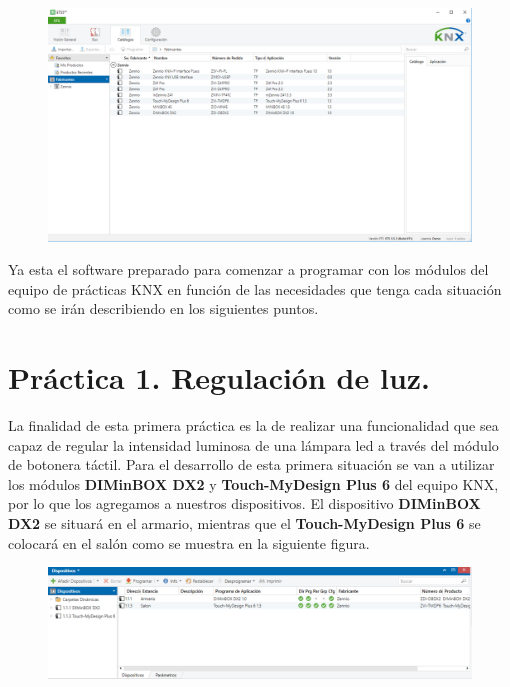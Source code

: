 \documentclass[10pt]{article}
\begin{document}
\begin{figure}[H]
	\begin{center}
	 		\includegraphics[width = 1.00\textwidth]{Imagenes/img1}
	\end{center} 
\end{figure}

Ya esta el software preparado para comenzar a programar con los módulos del equipo de prácticas KNX en función de las necesidades que tenga cada situación como se irán describiendo en los siguientes puntos. \\


\section{Práctica 1. Regulación de luz.} 
La finalidad de esta primera práctica es la de realizar una funcionalidad que sea capaz de regular la intensidad luminosa de una lámpara led a través del módulo de botonera táctil. Para el desarrollo de esta primera situación se van a utilizar los módulos \textbf{DIMinBOX DX2} y \textbf{Touch-MyDesign Plus 6} del equipo KNX, por lo que los agregamos a nuestros dispositivos. El dispositivo \textbf{DIMinBOX DX2} se situará en el armario, mientras que el \textbf{Touch-MyDesign Plus 6} se colocará en el salón como se muestra en la siguiente figura. \\

\begin{figure}[H]
	\begin{center}
	 		\includegraphics[width = 1.00\textwidth]{Imagenes/img2}
	\end{center} 
\end{figure}
\end{document}

